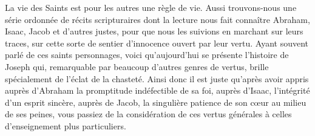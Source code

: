 La vie des Saints est pour les autres une règle de vie.
Aussi trouvons-nous une série ordonnée de récits scripturaires
	dont la lecture nous fait connaître Abraham,
		Isaac, Jacob et d’autres justes,
	pour que nous les suivions en marchant sur leurs traces,
	sur cette sorte de sentier d’innocence ouvert par leur vertu.
Ayant souvent parlé de ces saints personnages,
	voici qu’aujourd’hui se présente l’histoire de Joseph
	qui, remarquable par beaucoup d’autres genres de vertus,
	brille spécialement de l’éclat de la chasteté.
Ainsi donc il est juste qu’après avoir appris auprès d’Abraham
		la promptitude indéfectible de sa foi,
	auprès d’Isaac, l’intégrité d’un esprit sincère,
	auprès de Jacob, la singulière patience de son cœur au milieu de ses peines,
	vous passiez de la considération de ces vertus générales
	à celles d’enseignement plus particuliers.
